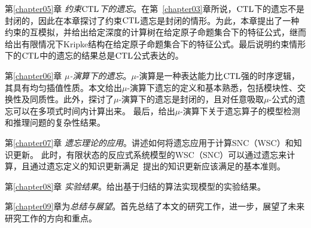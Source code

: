第\ref{chapter05}章 {\em 约束$\textrm{CTL}$下的遗忘}。在第~\ref{chapter03}章所说，$\textrm{CTL}$下的遗忘不是封闭的，因此在本章探讨了约束$\textrm{CTL}$遗忘是封闭的情形。为此，本章提出了一种约束的互模拟，并给出给定深度的计算树在给定原子命题集合下的特征公式，继而给出有限情况下Kripke结构在给定原子命题集合下的特征公式。最后说明约束情形下的$\textrm{CTL}$中的遗忘的结果总是$\textrm{CTL}$公式表达的。




第\ref{chapter06}章 {\em $\mu$-演算下的遗忘}。$\mu$-演算是一种表达能力比$\textrm{CTL}$强的时序逻辑，其具有均匀插值性质。本文给出$\mu$-演算下遗忘的定义和基本熟悉，包括模块性、交换性及同质性。此外，探讨了$\mu$-演算下的遗忘是封闭的，且对任意吸取$\mu$-公式的遗忘可以在多项式时间内计算出来。
最后，给出$\mu$-演算下关于遗忘算子的模型检测和推理问题的复杂性结果。



第\ref{chapter07}章 \textit{遗忘理论的应用}。讲述如何将遗忘应用于计算SNC（WSC）和知识更新。
此时，有限状态的反应式系统模型的WSC（SNC）可以通过遗忘来计算，且通过遗忘定义的知识更新满足~\citeauthor{katsuno91mendelzon}提出的知识更新应该满足的基本准则。

第\ref{chapter08}章 \textit{实验结果}。给出基于归结的算法实现模型的实验结果。


第\ref{chapter09}章为\textit{总结与展望}。首先总结了本文的研究工作，进一步，展望了未来研究工作的方向和重点。
